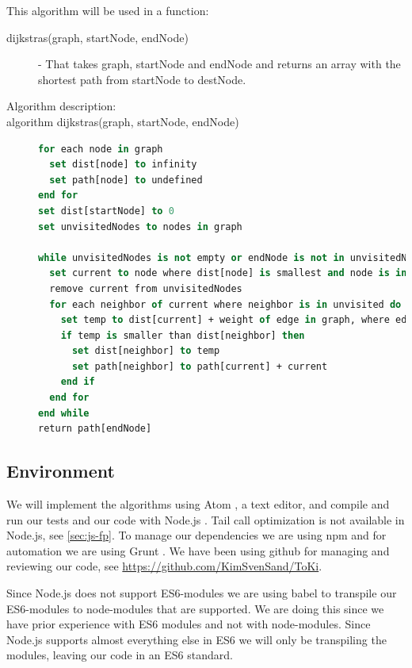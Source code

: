 \documentclass {article}
\begin{document}
This algorithm will be used in a function:
\begin{description}
\item[dijkstras(graph, startNode, endNode)] - That takes graph, startNode and endNode and returns an array with the shortest path from startNode to destNode. 

\item [Algorithm description:]
\item[algorithm dijkstras(graph, startNode, endNode)]
\item[]
\begin{lstlisting}[language=Pascal]
for each node in graph
  set dist[node] to infinity
  set path[node] to undefined
end for
set dist[startNode] to 0
set unvisitedNodes to nodes in graph

while unvisitedNodes is not empty or endNode is not in unvisitedNodes do
  set current to node where dist[node] is smallest and node is in unvisitedNodes 
  remove current from unvisitedNodes
  for each neighbor of current where neighbor is in unvisited do
    set temp to dist[current] + weight of edge in graph, where edge is from current to neighbor
    if temp is smaller than dist[neighbor] then
      set dist[neighbor] to temp
      set path[neighbor] to path[current] + current
    end if
  end for
end while
return path[endNode]
\end{lstlisting}
\end{description}
\subsection{Environment}
We will implement the algorithms using Atom \cite{atom}, a text editor, and compile and run our tests and our code with Node.js \cite{nodejs}. Tail call optimization is not available in Node.js, see \ref{sec:js-fp}. To manage our dependencies we are using npm \cite{npm} and for automation we are using Grunt \cite{grunt}. We have been using github for managing and reviewing our code, see \url{https://github.com/KimSvenSand/ToKi}.

Since Node.js does not support ES6-modules we are using babel \cite{babel} to transpile our ES6-modules to node-modules that are supported. We are doing this since we have prior experience with ES6 modules and not with node-modules. Since Node.js supports almost everything else in ES6 we will only be transpiling the modules, leaving our code in an ES6 standard.
\end{document}
